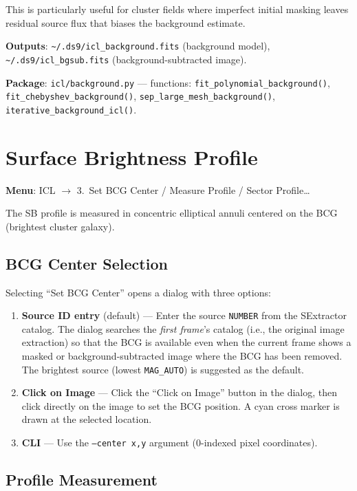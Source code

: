 \documentclass[11pt,fleqn]{book}
\begin{document}
This is particularly useful for cluster fields where imperfect initial masking leaves residual source flux that biases the background estimate.

\textbf{Outputs}: \texttt{\textasciitilde/.ds9/icl\_background.fits} (background model), \texttt{\textasciitilde/.ds9/icl\_bgsub.fits} (background-subtracted image).

\textbf{Package}: \texttt{icl/background.py} --- functions: \texttt{fit\_polynomial\_background()}, \texttt{fit\_chebyshev\_background()}, \texttt{sep\_large\_mesh\_background()}, \texttt{iterative\_background\_icl()}.


\section{Surface Brightness Profile}
\label{sec:icl-profile}

\textbf{Menu}: ICL $\to$ 3.\ Set BCG Center / Measure Profile / Sector Profile\ldots

The SB profile is measured in concentric elliptical annuli centered on the BCG (brightest cluster galaxy).

\subsection{BCG Center Selection}

Selecting ``Set BCG Center'' opens a dialog with three options:

\begin{enumerate}[leftmargin=2em]
  \item \textbf{Source ID entry} (default) --- Enter the source \texttt{NUMBER} from the SExtractor catalog.  The dialog searches the \emph{first frame}'s catalog (i.e., the original image extraction) so that the BCG is available even when the current frame shows a masked or background-subtracted image where the BCG has been removed.  The brightest source (lowest \texttt{MAG\_AUTO}) is suggested as the default.
  \item \textbf{Click on Image} --- Click the ``Click on Image'' button in the dialog, then click directly on the image to set the BCG position.  A cyan cross marker is drawn at the selected location.
  \item \textbf{CLI} --- Use the \texttt{--center x,y} argument (0-indexed pixel coordinates).
\end{enumerate}

\subsection{Profile Measurement}
\end{document}
